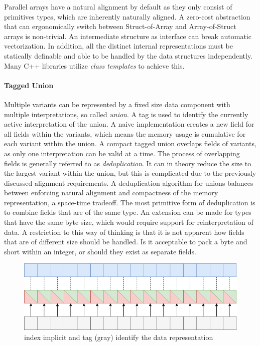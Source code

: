 \documentclass{article}
\begin{document}
Parallel arrays have a natural alignment by default as they only consist of primitives types, which are inherently naturally aligned.
A zero-cost abstraction that can ergonomically switch between Struct-of-Array and Array-of-Struct arrays is non-trivial.
An intermediate structure as interface can break automatic vectorization\cite{abstraction-vectorization}. 
In addition, all the distinct internal representations must be statically definable and able to be handled by the data structures independently.
Many C++ libraries utilize {\it class templates} to achieve this\cite{abstraction-vectorization}.

\paragraph{Tagged Union}

Multiple variants can be represented by a fixed size data component with multiple interpretations, so called {\it union}.
A tag is used to identify the currently active interpretation of the union. 
A naive implementation creates a new field for all fields within the variants, which means the memory usage is cumulative for each variant within the union. 
A compact tagged union overlaps fields of variants, as only one interpretation can be valid at a time.
The process of overlapping fields is generally referred to as {\it deduplication}.
It can in theory reduce the size to the largest variant within the union, but this is complicated due to the previously discussed alignment requirements\cite{accelerate-sum-types}.
A deduplication algorithm for unions balances between enforcing natural alignment and compactness of the memory representation, a space-time tradeoff.
The most primitive form of deduplication is to combine fields that are of the same type.
An extension can be made for types that have the same byte size, which would require support for reinterpretation of data.
A restriction to this way of thinking is that it is not apparent how fields that are of different size should be handled.
Is it acceptable to pack a byte and short within an integer, or should they exist as separate fields.

\begin{figure}[ht]
    \centering
    \includegraphics[scale=0.4]{taggedunion}
    \caption{ index implicit and tag (gray) identify the data representation }
\end{figure}
\end{document}
